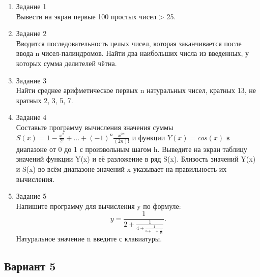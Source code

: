 \documentclass[a4paper]{article}
\begin{document}
	\begin{enumerate} 
		\item Задание 1 \\
			Вывести на экран первые 100 простых чисел > 25.\\
		\item Задание 2\\
			Вводится последовательность целых чисел, которая заканчивается после ввода n чисел-палиндромов.  
			Найти два наибольших числа из введенных, у которых сумма делителей чётна.\\
		\item Задание 3 \\
			Найти среднее арифметическое первых n натуральных чисел, кратных 13, не кратных 2, 3, 5, 7.\\
		\item Задание 4 \\
			Составьте программу вычисления значения суммы  $S(x)=1-\frac{x^2}{2!}+...+(-1)^n\frac{x^{2n}}{(2n)!}$
			и функции $Y(x)=cos(x)$ в диапазоне от 0 до 1
			с произвольным шагом h. Выведите на экран таблицу значений функции Y(x) и её разложение в ряд S(x). Близость значений Y(x) и S(x) во всём диапазоне
			значений x указывает на правильность их вычисления.\\
		\item Задание 5 \\
			Напишите программу для вычисления y по формуле:
			$$y=\frac{1}{2+\frac{1}{4+\frac{1}{6+...+\frac{1}{2n}}}}.$$
			Натуральное значение n введите с клавиатуры.\\
	\end{enumerate}
	
	\begin{center}
		\subsection*{Вариант 5}
	\end{center}
\end{document}
